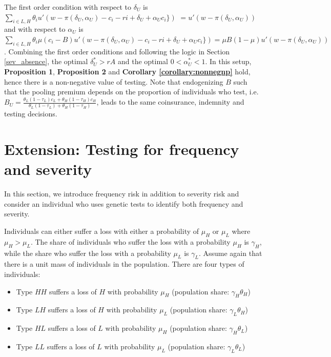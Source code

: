 \documentclass[nonatbib,preprint,12pt]{elsarticle}
\theoremstyle{plain}
\theoremstyle{definition}
\theoremstyle{plain}
\theoremstyle{TheoremNum}
\theoremstyle{CorollaryNum}
\theoremstyle{PropositionNum}
\theoremstyle{TheoremNum}
\begin{document}
The first order condition with respect to $\delta_U$ is $\sum_{i \in {L,H}} \theta_i u'(w-\pi(\delta_U,\alpha_U)-c_i- ri+\delta_U + \alpha_U c_i\})$ $ = u'(w-\pi(\delta_U,\alpha_U))$ and with respect to $\alpha_U$ is $\sum_{i \in {L,H}} \theta_i \mu (c_i - B) u'(w-\pi(\delta_U,\alpha_U)-c_i- ri+\delta_U + \alpha_U c_i\}) = \mu B (1-\mu)u'(w-\pi(\delta_U,\alpha_U))$. Combining the first order conditions and following the logic in Section \ref{sev_absence}, the optimal $\delta_U^* > rA$ and the optimal $0 < \alpha_U^* < 1$. In this setup, \textbf{Proposition 1}, \textbf{Proposition 2} and \textbf{Corollary \ref{corollary:nonnegnp}} hold, hence there is a non-negative value of testing. Note that endogenizing $B$ such that the pooling premium depends on the proportion of individuals who test, i.e. $B_U = \frac{\theta_L (1-\tau_L)c_L + \theta_H(1-\tau_H)c_H}{\theta_L(1-\tau_L) + \theta_H(1-\tau_H)}$, leads to the same coinsurance, indemnity and testing decisions.

\section{Extension: Testing for frequency and severity}

In this section, we introduce frequency risk in addition to severity risk and consider an individual who uses genetic tests to identify both frequency and severity. 

Individuals can either suffer a loss with either a probability of $\mu_H$ or $\mu_L$ where $\mu_H > \mu_L$. The share of individuals who suffer the loss with a probability $\mu_H$ is $\gamma_H$, while the share who suffer the loss with a probability $\mu_L$ is $\gamma_L$. Assume again that there is a unit mass of individuals in the population. There are four types of individuals:

\begin{itemize}
    \item Type $HH$ suffers a loss of $H$ with probability $\mu_H$ (population share: $\gamma_H\theta_H $)
    \item Type $LH$ suffers a loss of $H$ with probability $\mu_L$ (population share: $ \gamma_L\theta_H$)
    \item Type $HL$ suffers a loss of $L$ with probability $\mu_H$ (population share: $\gamma_H\theta_L $)
    \item Type $LL$ suffers a loss of $L$ with probability $\mu_L$ (population share: $\gamma_L\theta_L $)
\end{itemize}
\end{document}
